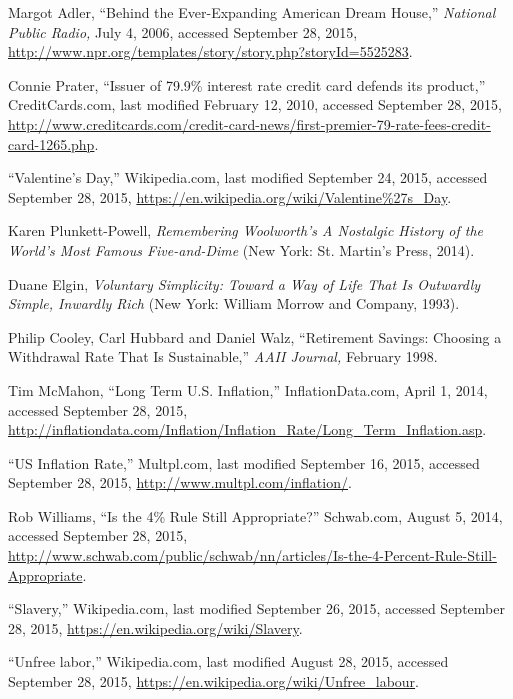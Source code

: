 \begin{thebibliography}{99}
Margot Adler,
``Behind the Ever-Expanding American Dream House,''
\emph{National Public Radio,}
July 4, 2006,
accessed September 28, 2015,
\url{http://www.npr.org/templates/story/story.php?storyId=5525283}.

Connie Prater,
``Issuer of 79.9\% interest rate credit card defends its product,''
CreditCards.com,
last modified February 12, 2010,
accessed September 28, 2015,\\
\url{http://www.creditcards.com/credit-card-news/first-premier-79-rate-fees-credit-card-1265.php}.

``Valentine's Day,''
Wikipedia.com,
last modified September 24, 2015,
accessed September 28, 2015,
\url{https://en.wikipedia.org/wiki/Valentine\%27s\_Day}.

Karen Plunkett-Powell,
\emph{Remembering Woolworth's A Nostalgic History of the World's Most Famous Five-and-Dime}
(New York: St. Martin's Press, 2014).

Duane Elgin,
\emph{Voluntary Simplicity: Toward a Way of Life That Is Outwardly Simple, Inwardly Rich}
(New York: William Morrow and Company, 1993).

Philip Cooley, Carl Hubbard and Daniel Walz,
``Retirement Savings: Choosing a Withdrawal Rate That Is Sustainable,''
\emph{AAII Journal,}
February 1998.

Tim McMahon,
``Long Term U.S. Inflation,''
InflationData.com,
April 1, 2014,
accessed September 28, 2015,
\url{http://inflationdata.com/Inflation/Inflation\_Rate/Long\_Term\_Inflation.asp}.

``US Inflation Rate,''
Multpl.com,
last modified September 16, 2015,
accessed September 28, 2015,
\url{http://www.multpl.com/inflation/}.

Rob Williams,
``Is the 4\% Rule Still Appropriate?''
Schwab.com,
August 5, 2014,
accessed September 28, 2015,\\
\url{http://www.schwab.com/public/schwab/nn/articles/Is-the-4-Percent-Rule-Still-Appropriate}.

``Slavery,''
Wikipedia.com,
last modified September 26, 2015,
accessed September 28, 2015,
\url{https://en.wikipedia.org/wiki/Slavery}.

``Unfree labor,''
Wikipedia.com,
last modified August 28, 2015,
accessed September 28, 2015,
\url{https://en.wikipedia.org/wiki/Unfree\_labour}.


\end{thebibliography}
